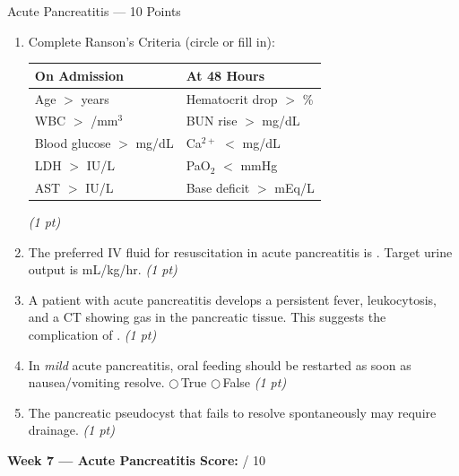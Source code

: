 \documentclass[11pt,letterpaper]{article}
\newcommand{\blank}[1][3cm]{\underline{\hspace{#1}}}
\begin{document}
\begin{diagbox}{Acute Pancreatitis --- 10 Points}
\begin{enumerate}[leftmargin=1.5em, label=\textbf{\arabic*.},start=21]
  \item Complete Ranson's Criteria (circle or fill in):

  \vspace{0.2cm}
  \begin{center}
  \renewcommand{\arraystretch}{1.6}
  \begin{tabular}{|p{5.5cm}|p{5.5cm}|}
  \hline
  \textbf{On Admission} & \textbf{At 48 Hours} \\
  \hline
  Age $>$ \blank[1.5cm] years & Hematocrit drop $>$ \blank[1.5cm]\% \\
  \hline
  WBC $>$ \blank[1.5cm] /mm$^3$ & BUN rise $>$ \blank[1.5cm] mg/dL \\
  \hline
  Blood glucose $>$ \blank[1.5cm] mg/dL & Ca$^{2+}$ $<$ \blank[1.5cm] mg/dL \\
  \hline
  LDH $>$ \blank[1.5cm] IU/L & PaO$_2$ $<$ \blank[1.5cm] mmHg \\
  \hline
  AST $>$ \blank[1.5cm] IU/L & Base deficit $>$ \blank[1.5cm] mEq/L \\
  \hline
  \end{tabular}
  \end{center}
  \hfill\textit{(1 pt)}

  \item The preferred IV fluid for resuscitation in acute pancreatitis is
        \blank[3cm].  Target urine output is \blank[2cm] mL/kg/hr.
        \hfill\textit{(1 pt)}

  \item A patient with acute pancreatitis develops a persistent fever, leukocytosis,
        and a CT showing gas in the pancreatic tissue.  This suggests the complication
        of \blank[5cm].
        \hfill\textit{(1 pt)}

  \item In \emph{mild} acute pancreatitis, oral feeding should be restarted as soon as
        nausea/vomiting resolve.
        \quad$\bigcirc$\,True \quad$\bigcirc$\,False
        \hfill\textit{(1 pt)}

  \item The pancreatic pseudocyst that fails to resolve spontaneously may require
        \blank[5cm] drainage.
        \hfill\textit{(1 pt)}

\end{enumerate}

\vspace{0.3cm}
\textbf{Week 7 --- Acute Pancreatitis Score:} \blank[1cm] / 10
\end{diagbox}
\end{document}
